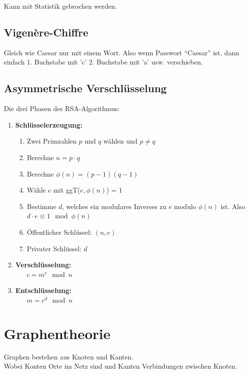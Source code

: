 \documentclass[12pt]{scrartcl}
\begin{document}
Kann mit Statistik gebrochen werden.\\

\subsection{Vigenère-Chiffre}
Gleich wie Caesar nur mit einem Wort. Also wenn Passwort ``Caesar'' ist,
dann einfach 1. Buchstabe mit 'c' 2. Buchstabe mit 'a' usw. verschieben.\\


\subsection{Asymmetrische Verschlüsselung}
Die drei Phasen des RSA-Algorithmus:
\begin{enumerate}
    \item \textbf{Schlüsselerzeugung:}
    \begin{enumerate}
        \item Zwei Primzahlen $p$ und $q$ wählen und $p \neq q$
        \item Berechne $n = p \cdot q$
        \item Berechne $\phi(n) = (p-1)(q-1)$
        \item Wähle $e$ mit ggT($e, \phi(n)$) = 1
        \item Bestimme $d$, welches ein modulares Inverses zu $e$ modulo $\phi(n)$ ist. Also \\
        $d \cdot e \equiv 1 \mod \phi(n)$
        \item Öffentlicher Schlüssel: $(n, e)$
        \item Privater Schlüssel: $d$
    \end{enumerate}
    \item \textbf{Verschlüsselung:}\\
    $\text{ }\quad c = m^e \mod n$
    \item \textbf{Entschlüsselung:}\\
    $\text{ }\quad m = c^d \mod n$
\end{enumerate}



\newpage
\section{Graphentheorie}
Graphen bestehen aus Knoten und Kanten.\\
Wobei Konten Orte im Netz sind und Kanten Verbindungen zwischen Knoten.\\
\end{document}
